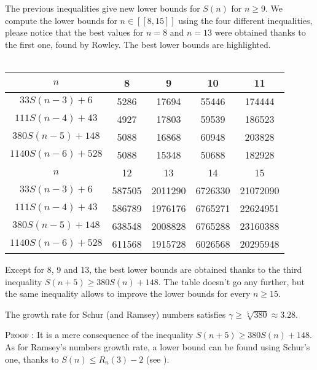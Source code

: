 The previous inequalities give new lower bounds for \(S(n)\) for
\( n \geqslant 9 \). We compute the lower
bounds for \( n \in [\![8,15]\!] \) using the four different inequalities, please notice that the best values for \( n
=8\) and \(n = 13\) were obtained thanks to the first one, found by Rowley. The best lower bounds are highlighted.\\
\\
\begin{center}
\begin{tabular}{|*{5}{c|}}
    \hline
	\(n\) & 8 & 9 & 10 & 11 \\
	\hline
	\(33S(n-3) + 6 \) & \cellcolor{yellow} 5286 & 17694 & 55446 & 174444\\
	\hline
	\(111S(n-4) + 43 \) & 4927 & \cellcolor{yellow} 17803 & 59539 & 186523\\
	\hline
	\(380S(n-5) + 148 \) & 5088 & 16868 & \cellcolor{yellow} 60948 & \cellcolor{yellow} 203828 \\
	\hline
	\(1140S(n-6) + 528 \) & 5088 & 15348 & 50688 & 182928\\
	\hline
	\hline
	\(n\) & 12 & 13 & 14 & 15 \\
	\hline
	\(33S(n-3) + 6 \) & 587505 & \cellcolor{yellow} 2011290 & 6726330 & 21072090\\
	\hline
	\(111S(n-4) + 43 \) & 586789 & 1976176 & 6765271 & 22624951 \\
	\hline
\(380S(n-5) + 148 \) & \cellcolor{yellow} 638548 & 2008828 & \cellcolor{yellow} 6765288 & \cellcolor{yellow} 23160388 \\\hline
	\(1140S(n-6) + 528 \) & 611568 & 1915728 & 6026568 & 20295948 \\
	\hline
\end{tabular}
\end{center}
Except for 8, 9 and 13, the best lower bounds are obtained thanks to
the third inequality \( S(n+5) \geqslant 380S(n) + 148\). The table
doesn't go any further, but the same inequality allows to improve the
lower bounds for every \( n \geqslant 15 \).

\begin{corollary}
The growth rate for Schur (and Ramsey) numbers satisfies \(\gamma \geqslant \sqrt[5]{380} \approx 3.28 \).
\end{corollary}
\textsc{Proof :} It is a mere consequence of the inequality \( S(n+5) \geqslant 380S(n) + 148\). As for Ramsey's
numbers growth rate, a lower bound can be found using Schur's one, thanks to \(S(n) \leqslant R_n(3)-2 \)
(see \cite{Schur1917}).
